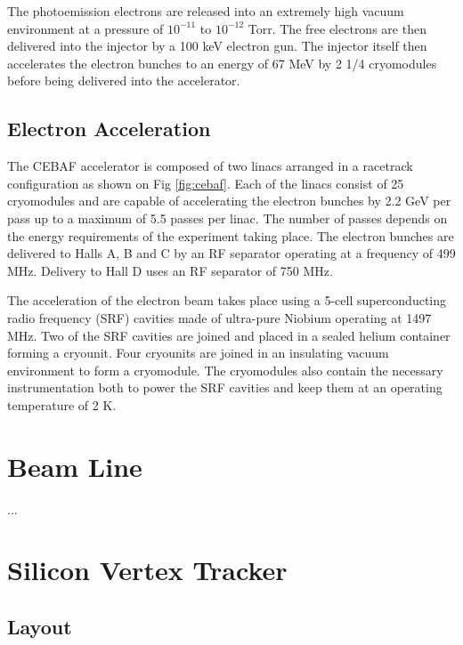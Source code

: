 The photoemission electrons are released into an extremely high vacuum
environment at a pressure of $10^{-11}$ to $10^{-12}$ Torr.  The free electrons
are then delivered into the injector by a 100 keV electron gun.  The injector
itself then accelerates the electron bunches to an energy of 67 MeV by 2 1/4
cryomodules before being delivered into the accelerator.

\subsection{Electron Acceleration}

The CEBAF accelerator is composed of two linacs arranged in a racetrack
configuration as shown on Fig \ref{fig:cebaf}. Each of the linacs consist
of 25 cryomodules and are capable of accelerating the electron bunches 
by 2.2 GeV per pass up to a maximum of 5.5 passes per linac.  The number of 
passes depends on the energy requirements of the experiment taking place.
The electron bunches are delivered to Halls A, B and C by an RF separator
operating at a frequency of 499 MHz.  Delivery to Hall D uses an RF separator
of 750 MHz.

The acceleration of the electron beam takes place using a 5-cell 
superconducting radio frequency (SRF) cavities made of ultra-pure Niobium 
operating at 1497 MHz.  Two of the SRF cavities are joined and placed in a 
sealed helium container forming a cryounit.  Four cryounits are joined in an
insulating vacuum environment to form a cryomodule.  The cryomodules also
contain the necessary instrumentation both to power the SRF cavities and keep
them at an operating temperature of 2 K.

\section{Beam Line}

...

\section{Silicon Vertex Tracker}

\subsection{Layout}


